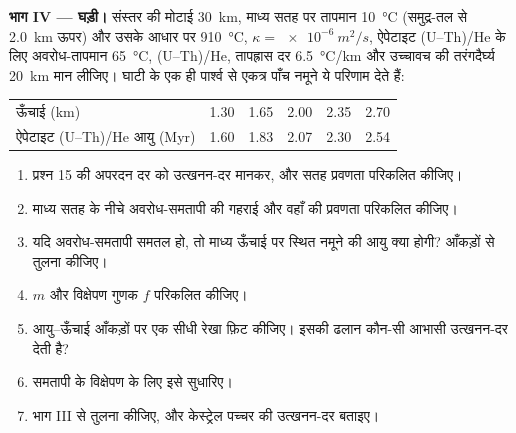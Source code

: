 \begin{problem}
\medskip\noindent\textbf{भाग IV --- घड़ी।}
संस्तर की मोटाई \qty{30}{km}, माध्य सतह पर तापमान \qty{10}{\celsius}
(समुद्र-तल से \qty{2.0}{km} ऊपर) और उसके आधार पर \qty{910}{\celsius}, $\kappa
= \qty{e-6}{m^2/s}$, ऐपेटाइट (U--Th)/He के लिए अवरोध-तापमान \qty{65}{\celsius},
(U--Th)/He, तापह्रास दर \qty{6.5}{\celsius/km} और उच्चावच की
तरंगदैर्घ्य \qty{20}{km} मान लीजिए। घाटी के एक ही पार्श्व से एकत्र पाँच नमूने ये परिणाम देते हैं:
\begin{center}
\small
\begin{tabular}{lccccc}
\hline
ऊँचाई (\unit{km}) & 1.30 & 1.65 & 2.00 & 2.35 & 2.70 \\
ऐपेटाइट (U--Th)/He आयु (\unit{Myr}) & 1.60 & 1.83 & 2.07 & 2.30 & 2.54 \\
\hline
\end{tabular}
\end{center}
\begin{enumerate}[resume]
  \item प्रश्न 15 की अपरदन दर को उत्खनन-दर मानकर,
         और सतह प्रवणता परिकलित कीजिए।
  \item माध्य सतह के नीचे अवरोध-समतापी की गहराई और
        वहाँ की प्रवणता परिकलित कीजिए।
  \item यदि अवरोध-समतापी समतल हो, तो माध्य ऊँचाई पर स्थित नमूने की
        आयु क्या होगी? आँकड़ों से तुलना कीजिए।
  \item $m$ और विक्षेपण गुणक $f$ परिकलित कीजिए।
  \item आयु--ऊँचाई आँकड़ों पर एक सीधी रेखा फ़िट कीजिए। इसकी ढलान कौन-सी
        आभासी उत्खनन-दर देती है?
  \item समतापी के विक्षेपण के लिए इसे सुधारिए।
  \item भाग III से तुलना कीजिए, और केस्ट्रेल
        पच्चर की उत्खनन-दर बताइए।
\end{enumerate}
\end{problem}
